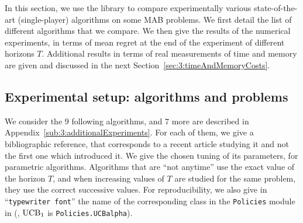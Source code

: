 
In this section, we use the \SMPyBandits{} library to compare experimentally various state-of-the-art (single-player) algorithms on some MAB problems.
We first detail the list of different algorithms that we compare.
We then give the results of the numerical experiments, in terms of mean regret at the end of the experiment of different horizons $T$.
Additional results in terms of real measurements of time and memory are given and discussed in the next Section~\ref{sec:3:timeAndMemoryCosts}.


\subsection{Experimental setup: algorithms and problems}


We consider the $9$ following algorithms, and $7$ more are described in Appendix~\ref{sub:3:additionalExperiments}.
For each of them, we give a bibliographic reference, that corresponds to a recent article studying it and not the first one which introduced it.
We give the chosen tuning of its parameters, for parametric algorithms.
Algorithms that are ``not anytime'' use the exact value of the horizon $T$, and when increasing values of $T$ are studied for the same problem, they use the correct successive values.
%
For reproducibility, we also give in ``\texttt{typewriter font}'' the name of the corresponding class in the \texttt{Policies} module in \SMPyBandits{} (\eg, $\mathrm{UCB}_1$ is \texttt{Policies.UCBalpha}).

